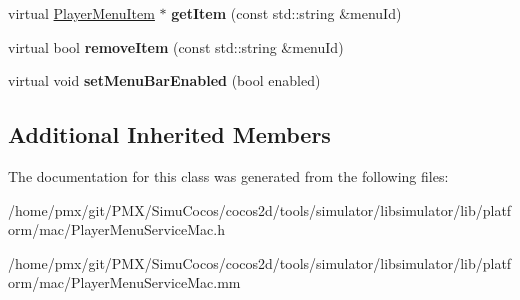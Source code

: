 \begin{DoxyCompactItemize}
\item 
\mbox{\label{classPlayerMenuServiceMac_a3b82c2c94b56874286c843db0a557be7}} 
virtual \hyperlink{classPlayerMenuItem}{Player\+Menu\+Item} $\ast$ {\bfseries get\+Item} (const std\+::string \&menu\+Id)
\item 
\mbox{\label{classPlayerMenuServiceMac_a1d26d1d969002ab105f152278ce16832}} 
virtual bool {\bfseries remove\+Item} (const std\+::string \&menu\+Id)
\item 
\mbox{\label{classPlayerMenuServiceMac_a7dc6f9f02601a9799d4fa9d8697a5932}} 
virtual void {\bfseries set\+Menu\+Bar\+Enabled} (bool enabled)
\end{DoxyCompactItemize}
\subsection*{Additional Inherited Members}


The documentation for this class was generated from the following files\+:\begin{DoxyCompactItemize}
\item 
/home/pmx/git/\+P\+M\+X/\+Simu\+Cocos/cocos2d/tools/simulator/libsimulator/lib/platform/mac/Player\+Menu\+Service\+Mac.\+h\item 
/home/pmx/git/\+P\+M\+X/\+Simu\+Cocos/cocos2d/tools/simulator/libsimulator/lib/platform/mac/Player\+Menu\+Service\+Mac.\+mm\end{DoxyCompactItemize}
